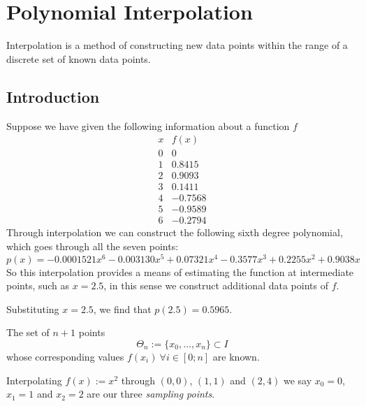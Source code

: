 

\newpage

\section{Polynomial Interpolation}
Interpolation is a method of constructing new data points within the range of a discrete set of known data points.

\subsection{Introduction}
Suppose we have given the following information about a function \(f\)
\[\begin{array}{|c|c|}
   x & f(x)  \\
   \hline
   0 & 0       \\
   1 & 0.8415  \\
   2 & 0.9093  \\
   3 & 0.1411  \\
   4 & -0.7568 \\
   5 & -0.9589 \\
   6 & -0.2794
\end{array}\]
Through interpolation we can construct the following sixth degree polynomial, which goes through all the seven points:
\[p(x) = -0.0001521 x^6 - 0.003130 x^5 + 0.07321 x^4 - 0.3577 x^3 + 0.2255 x^2 + 0.9038x\]
So this interpolation provides a means of estimating the function at intermediate points, such as \(x = 2.5\), in this sense we construct additional data points of \(f\).

Substituting \(x = 2.5\), we find that \(p(2.5) = 0.5965\).
\begin{center}
   
\end{center}

\begin{definition}
   The set of \(n+1\) points
   \[\Theta_n := \{x_0, \ldots, x_n\} \subset I\]
   whose corresponding values \(f(x_i)~\forall i \in [0; n]\) are known.
\end{definition}
\begin{example}
   Interpolating \(f(x) := x^2\) through \((0, 0)\), \((1, 1)\) and \((2, 4)\) we say \(x_0 = 0\), \(x_1 = 1\) and \(x_2 = 2\) are our three \emph{sampling points}.
\end{example}

